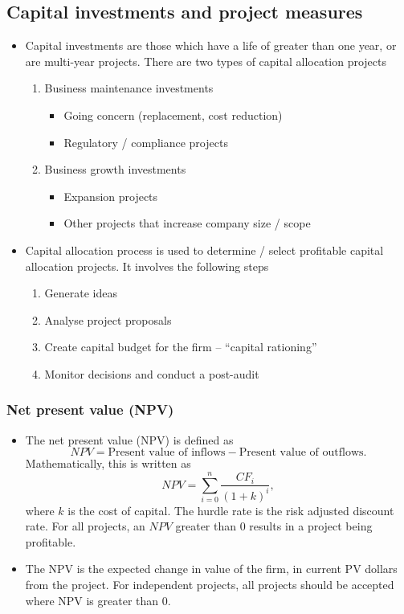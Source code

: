 \documentclass[../notes_compiled.tex]{subfiles}
\begin{document}
\subsection{Capital investments and project measures}
\begin{itemize}
\item Capital investments are those which have a life of greater than one year, or are multi-year projects. There are two types of capital allocation projects
\begin{enumerate}
\item Business maintenance investments
\begin{itemize}
\item Going concern (replacement, cost reduction)
\item Regulatory / compliance projects
\end{itemize}
\item Business growth investments
\begin{itemize}
\item Expansion projects
\item Other projects that increase company size / scope
\end{itemize}
\end{enumerate}

\item Capital allocation process is used to determine / select profitable capital allocation projects. It involves the following steps
\begin{enumerate}
\item Generate ideas
\item Analyse project proposals
\item Create capital budget for the firm -- ``capital rationing''
\item Monitor decisions and conduct a post-audit
\end{enumerate}
\end{itemize}

\subsubsection{Net present value (NPV)}
\begin{itemize}
\item The net present value (NPV) is defined as
\begin{equation}
NPV = \text{Present value of inflows} - \text{Present value of outflows}.
\end{equation}
Mathematically, this is written as
\begin{equation}
NPV = \sum_{i=0}^{n} \frac{CF_{i}}{(1+k)^{i}},
\end{equation}
where $k$ is the cost of capital. The hurdle rate is the risk adjusted discount rate. For all projects, an $NPV$ greater than 0 results in a project being profitable.
\item[] The NPV is the expected change in value of the firm, in current PV dollars from the project. For independent projects, all projects should be accepted where NPV is greater than 0.
\end{itemize}
\end{document}
